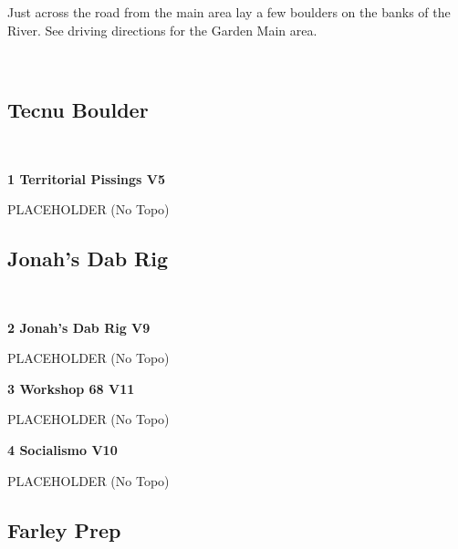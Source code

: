\begin{multicols*}{2}
Just across the road from the main area lay a few boulders on the banks of the River. See driving directions for the Garden Main area.

	\
			\subsection*{Tecnu Boulder}\label{bf:Tecnu Boulder}
			\
			
					\label{rt:Territorial Pissings} \colorbox{RoyalBlue!20}{\textbf{1 Territorial Pissings V5  }}
					\begin{adjustwidth}{1cm}{}
					PLACEHOLDER
						\newline (No Topo) 
					\end{adjustwidth}
			\subsection*{Jonah's Dab Rig}\label{bf:Jonah's Dab Rig}
			\
			
					\label{rt:Jonah's Dab Rig} \colorbox{Goldenrod!50}{\textbf{2 Jonah's Dab Rig V9  }}
					\begin{adjustwidth}{1cm}{}
					PLACEHOLDER
						\newline (No Topo) 
					\end{adjustwidth}
					\label{rt:Workshop 68} \colorbox{red!20}{\textbf{3 Workshop 68 V11  }}
					\begin{adjustwidth}{1cm}{}
					PLACEHOLDER
						\newline (No Topo) 
					\end{adjustwidth}
					\label{rt:Socialismo} \colorbox{red!20}{\textbf{4 Socialismo V10  }}
					\begin{adjustwidth}{1cm}{}
					PLACEHOLDER
						\newline (No Topo) 
					\end{adjustwidth}
			\subsection*{Farley Prep}\label{bf:Farley Prep}
			\
			

\end{multicols*}
